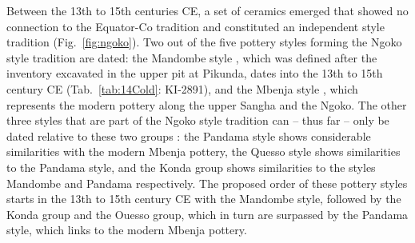 \documentclass[smallextended,natbib]{svjour3}       %
\begin{document}
Between the 13th to 15th centuries CE, a set of ceramics emerged that showed no connection to the Equator-Co tradition and constituted an independent style tradition (Fig.~\ref{fig:ngoko}). Two out of the five pottery styles forming the Ngoko style tradition are dated: the Mandombe style \citep[145--148]{Seidensticker.2021e}, which was defined after the inventory excavated in the upper pit at Pikunda, dates into the 13th to 15th century CE (Tab.~\ref{tab:14Cold}: KI-2891), and the Mbenja style \citep[158--162]{Seidensticker.2021e}, which represents the modern pottery along the upper Sangha and the Ngoko. The other three styles that are part of the Ngoko style tradition can -- thus far -- only be dated relative to these two groups \citep[121--123 Fig.~6.5]{Seidensticker.2016b}: the Pandama style \citep[155--158]{Seidensticker.2021e} shows considerable similarities with the modern Mbenja pottery, the Quesso style \citep[152--155]{Seidensticker.2021e} shows similarities to the Pandama style, and the Konda group \citep[148--152]{Seidensticker.2021e} shows similarities to the styles Mandombe and Pandama respectively. The proposed order of these pottery styles starts in the 13th to 15th century CE with the Mandombe style, followed by the Konda group and the Ouesso group, which in turn are surpassed by the Pandama style, which links to the modern Mbenja pottery.
\end{document}
